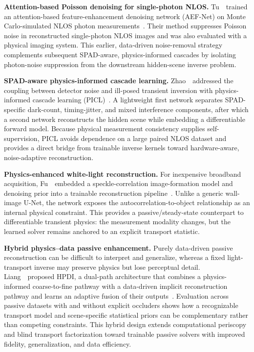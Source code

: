 \vspace{0.8mm}
\noindent \textbf{Attention-based Poisson denoising for single-photon NLOS.}
Tu~\etal~trained an attention-based feature-enhancement denoising network (AEF-Net) on Monte Carlo-simulated NLOS photon measurements~\cite{tuPoissonDenoisingNLOS2023}. Their method suppresses Poisson noise in reconstructed single-photon NLOS images and was also evaluated with a physical imaging system. This earlier, data-driven noise-removal strategy complements subsequent SPAD-aware, physics-informed cascades by isolating photon-noise suppression from the downstream hidden-scene inverse problem.

\vspace{0.8mm}
\noindent \textbf{SPAD-aware physics-informed cascade learning.}
Zhao~\etal~addressed the coupling between detector noise and ill-posed transient inversion with physics-informed cascade learning (PICL)~\cite{zhaoPICL2026}. A lightweight first network separates SPAD-specific dark-count, timing-jitter, and mixed interference components, after which a second network reconstructs the hidden scene while embedding a differentiable forward model. Because physical measurement consistency supplies self-supervision, PICL avoids dependence on a large paired NLOS dataset and provides a direct bridge from trainable inverse kernels toward hardware-aware, noise-adaptive reconstruction.


\vspace{0.8mm}
\noindent \textbf{Physics-enhanced white-light reconstruction.}
For inexpensive broadband acquisition, Fu~\etal~embedded a speckle-correlation image-formation model and denoising prior into a trainable reconstruction pipeline~\cite{fuPhysicsEnhancedWhiteLightNLOS2025}. Unlike a generic wall-image U-Net, the network exposes the autocorrelation-to-object relationship as an internal physical constraint. This provides a passive/steady-state counterpart to differentiable transient physics: the measurement modality changes, but the learned solver remains anchored to an explicit transport statistic.

\vspace{0.8mm}
\noindent \textbf{Hybrid physics--data passive enhancement.}
Purely data-driven passive reconstruction can be difficult to interpret and generalize, whereas a fixed light-transport inverse may preserve physics but lose perceptual detail. Liang~\etal~proposed HPDI, a dual-path architecture that combines a physics-informed coarse-to-fine pathway with a data-driven implicit reconstruction pathway and learns an adaptive fusion of their outputs~\cite{liangHPDIPassiveNLOS2026}. Evaluation across passive datasets with and without explicit occluders shows how a recognizable transport model and scene-specific statistical priors can be complementary rather than competing constraints. This hybrid design extends computational periscopy and blind transport factorization toward trainable passive solvers with improved fidelity, generalization, and data efficiency.

